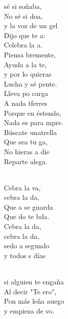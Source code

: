 \documentclass[12pt]{article}
\begin{document}
\begin{multicols*}{2}
\begin{cancion}%
	 sé si soñaba,\\
	No sé si doa, \\
	y la voz de un gel\\
	Dijo que te a:\\
	Celebra la a.   \\
	Piensa bremente,\\
	Ayuda a la te,\\
	y por lo  quieras\\
	Lucha y sé pente.\\
	Lleva po carga\\
	A nada tferres\\
	Porque en éstendo,\\
	Nada es para mpre.\\
	Búscate unatrella\\
	Que sea tu ga, \\
	No hieras a die\\
	Reparte alega.\\\jump\\
	\begin{chorus}%
	Cebra la va, \\
	cebra la da,\\
	Que a se guarda\\
	Que do te bda.\\
\jump
	Cebra la da, \\
	cebra la da,\\
	sedo a segundo\\
	y todos s días\\
	\end{chorus}%
	\jump\\
	si alguien te engaña\\
	Al decir "Te ero",\\
	Pon más leña auego\\
	y empieza de vo.\\

\end{cancion}
\end{multicols*}
\end{document}
